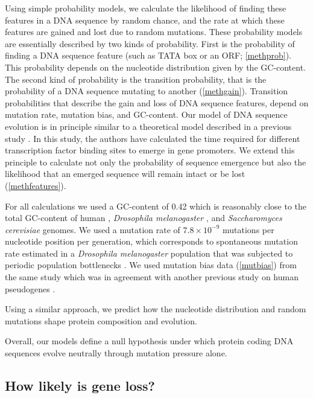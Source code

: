 \documentclass[12pt,a4paper]{article}
\begin{document}
Using simple probability models, we calculate the likelihood of finding these features in a DNA sequence by random chance, and the rate at which these features are gained and lost due to random mutations. These probability models are essentially described by two kinds of probability. First is the probability of finding a DNA sequence feature (such as TATA box or an ORF; \autoref{methprob}). This probability depends on the nucleotide distribution given by the GC-content. The second kind of probability is the transition probability, that is the probability of a DNA sequence mutating to another (\autoref{methgain}). Transition probabilities that describe the gain and loss of DNA sequence features, depend on mutation rate, mutation bias, and GC-content. Our model of DNA sequence evolution is in principle similar to a theoretical model described in a previous study \citep{promoterWaiting}. In this study, the authors have calculated the time required for different transcription factor binding sites to emerge in gene promoters. We extend this principle to calculate not only the probability of sequence emergence but also the likelihood that an emerged sequence will remain intact or be lost (\autoref{methfeatures}).

For all calculations we used a GC-content of 0.42 which is reasonably close to the total GC-content of human \citep[0.41,][]{Merchant2007}, \textit{Drosophila melanogaster} \citep[0.416,][]{flybase}, and \textit{Saccharomyces cerevisiae} \citep[0.38,][]{yeastGC} genomes. We used a mutation rate of $7.8\times10^{-9}$ mutations per nucleotide position per generation, which corresponds to spontaneous mutation rate estimated in a \textit{Drosophila melanogaster} population that was subjected to periodic population bottlenecks \cite[mutation accumulation line,][]{drosophilamutrate}. We used mutation bias data (\autoref{mutbias}) from the same study \citep{drosophilamutrate} which was in agreement with another previous study on human pseudogenes \citep{humanmutrate}.

Using a similar approach, we predict how the nucleotide distribution and random mutations shape protein composition and evolution. 

Overall, our models define a null hypothesis under which protein coding DNA sequences evolve neutrally through mutation pressure alone.

\subsection{How likely is gene loss?}
\end{document}
